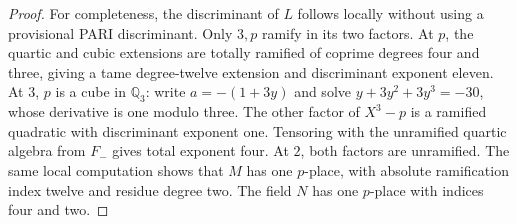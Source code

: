 \begin{proof}
For completeness, the discriminant of $L$ follows locally without
using a provisional PARI discriminant.  Only $3,p$ ramify in its
two factors.  At $p$, the quartic and cubic extensions are totally
ramified of coprime degrees four and three, giving a tame degree-twelve
extension and discriminant exponent eleven.  At $3$, $p$ is a cube
in $\mathbb Q_3$: write $a=-(1+3y)$ and solve
$y+3y^2+3y^3=-30$, whose derivative is one modulo three.
The other factor of $X^3-p$ is a ramified quadratic with discriminant
exponent one.  Tensoring with the unramified quartic algebra from
$F_-$ gives total exponent four.  At $2$, both factors are unramified.
The same local computation shows that $M$ has one $p$-place,
with absolute ramification index twelve and residue degree two.
The field $N$ has one $p$-place with indices four and two.


\end{proof}
